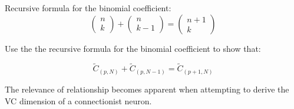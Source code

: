 \begin{frame}
Recursive formula for the binomial coefficient:
\begin{equation}
			\left( \begin{array}{c}
			n\\
			k
			\end{array}\right)+
			\left( \begin{array}{c}
			n\\
			k-1
			\end{array}\right)=
			\left( \begin{array}{c}
			n+1\\
			k
			\end{array}\right)
\end{equation}

Use the the recursive formula for the binomial coefficient to show that:

\begin{equation}
\tilde C_{(p,N)}+\tilde C_{(p,N-1)}=\tilde C_{(p+1,N)}
\label{eq:c_relation}
\end{equation}

The relevance of \notesonly{\eqref{eq:c_relation}} relationship becomes apparent when attempting to derive the VC dimension of a connectionist neuron.

\end{frame}

